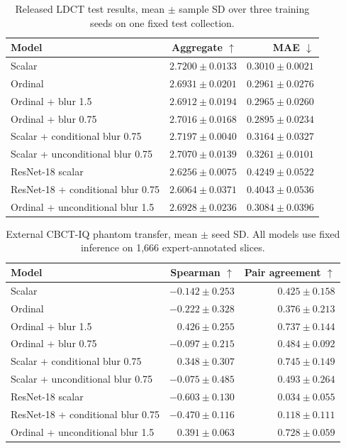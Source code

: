 \begin{table}[ht]\centering\small
\caption{Released LDCT test results, mean $\pm$ sample SD over three training seeds on one fixed test collection.}
\begin{tabular}{lrr}\toprule Model & Aggregate $\uparrow$ & MAE $\downarrow$ \\ \midrule
Scalar & $2.7200\pm0.0133$ & $0.3010\pm0.0021$ \\
Ordinal & $2.6931\pm0.0201$ & $0.2961\pm0.0276$ \\
Ordinal + blur 1.5 & $2.6912\pm0.0194$ & $0.2965\pm0.0260$ \\
Ordinal + blur 0.75 & $2.7016\pm0.0168$ & $0.2895\pm0.0234$ \\
Scalar + conditional blur 0.75 & $2.7197\pm0.0040$ & $0.3164\pm0.0327$ \\
Scalar + unconditional blur 0.75 & $2.7070\pm0.0139$ & $0.3261\pm0.0101$ \\
ResNet-18 scalar & $2.6256\pm0.0075$ & $0.4249\pm0.0522$ \\
ResNet-18 + conditional blur 0.75 & $2.6064\pm0.0371$ & $0.4043\pm0.0536$ \\
Ordinal + unconditional blur 1.5 & $2.6928\pm0.0236$ & $0.3084\pm0.0396$ \\
\bottomrule\end{tabular}\label{tab:ldct}\end{table}
\begin{table}[ht]\centering\small
\caption{External CBCT-IQ phantom transfer, mean $\pm$ seed SD. All models use fixed inference on 1,666 expert-annotated slices.}
\begin{tabular}{lrr}\toprule Model & Spearman $\uparrow$ & Pair agreement $\uparrow$ \\ \midrule
Scalar & $-0.142\pm0.253$ & $0.425\pm0.158$ \\
Ordinal & $-0.222\pm0.328$ & $0.376\pm0.213$ \\
Ordinal + blur 1.5 & $0.426\pm0.255$ & $0.737\pm0.144$ \\
Ordinal + blur 0.75 & $-0.097\pm0.215$ & $0.484\pm0.092$ \\
Scalar + conditional blur 0.75 & $0.348\pm0.307$ & $0.745\pm0.149$ \\
Scalar + unconditional blur 0.75 & $-0.075\pm0.485$ & $0.493\pm0.264$ \\
ResNet-18 scalar & $-0.603\pm0.130$ & $0.034\pm0.055$ \\
ResNet-18 + conditional blur 0.75 & $-0.470\pm0.116$ & $0.118\pm0.111$ \\
Ordinal + unconditional blur 1.5 & $0.391\pm0.063$ & $0.728\pm0.059$ \\
\bottomrule\end{tabular}\label{tab:external}\end{table}
